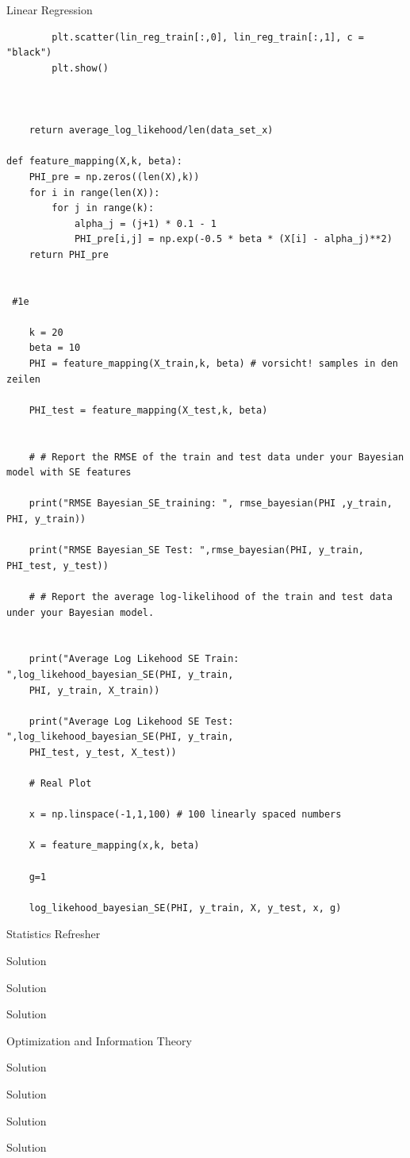 \begin{task}{Linear Regression}
\begin{subtask}
\begin{lstlisting}
        plt.scatter(lin_reg_train[:,0], lin_reg_train[:,1], c = "black")
        plt.show()
    
    
        
    return average_log_likehood/len(data_set_x)

def feature_mapping(X,k, beta):
    PHI_pre = np.zeros((len(X),k))
    for i in range(len(X)):
        for j in range(k):
            alpha_j = (j+1) * 0.1 - 1
            PHI_pre[i,j] = np.exp(-0.5 * beta * (X[i] - alpha_j)**2)
    return PHI_pre
    
    
 #1e
    
    k = 20
    beta = 10
    PHI = feature_mapping(X_train,k, beta) # vorsicht! samples in den zeilen

    PHI_test = feature_mapping(X_test,k, beta)

    
    # # Report the RMSE of the train and test data under your Bayesian model with SE features
    
    print("RMSE Bayesian_SE_training: ", rmse_bayesian(PHI ,y_train, PHI, y_train))
    
    print("RMSE Bayesian_SE Test: ",rmse_bayesian(PHI, y_train, PHI_test, y_test))
    
    # # Report the average log-likelihood of the train and test data under your Bayesian model.
    
    
    print("Average Log Likehood SE Train: ",log_likehood_bayesian_SE(PHI, y_train, 
    PHI, y_train, X_train))
    
    print("Average Log Likehood SE Test: ",log_likehood_bayesian_SE(PHI, y_train, 
    PHI_test, y_test, X_test))
    
    # Real Plot
    
    x = np.linspace(-1,1,100) # 100 linearly spaced numbers
    
    X = feature_mapping(x,k, beta)
    
    g=1
    
    log_likehood_bayesian_SE(PHI, y_train, X, y_test, x, g)
\end{lstlisting}
\end{subtask}
\end{task}

\begin{task}{Statistics Refresher}
\begin{subtask}
Solution
\end{subtask}
\begin{subtask}
Solution
\end{subtask}
\begin{subtask}
Solution
\end{subtask}
\end{task}

\begin{task}{Optimization and Information Theory}
\begin{subtask}
Solution
\end{subtask}
\begin{subtask}
Solution
\end{subtask}
\begin{subtask}
Solution
\end{subtask}
\begin{subtask}
Solution
\end{subtask}
\end{task}